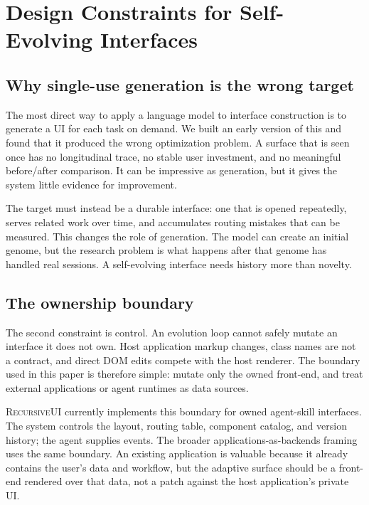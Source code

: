 \documentclass[11pt]{article}
\begin{document}
\section{Design Constraints for Self-Evolving Interfaces}
\label{sec:position}

\subsection{Why single-use generation is the wrong target}
\label{sec:seenonce}

The most direct way to apply a language model to interface construction is to
generate a UI for each task on demand. We built an early version of this and
found that it produced the wrong optimization problem. A surface that is seen
once has no longitudinal trace, no stable user investment, and no meaningful
before/after comparison. It can be impressive as generation, but it gives the
system little evidence for improvement.

The target must instead be a durable interface: one that is opened repeatedly,
serves related work over time, and accumulates routing mistakes that can be
measured. This changes the role of generation. The model can create an initial
genome, but the research problem is what happens after that genome has handled
real sessions. A self-evolving interface needs history more than novelty.

\subsection{The ownership boundary}
\label{sec:appsasbackends}

The second constraint is control. An evolution loop cannot safely mutate an
interface it does not own. Host application markup changes, class names are not a
contract, and direct DOM edits compete with the host renderer. The boundary used
in this paper is therefore simple: mutate only the owned front-end, and treat
external applications or agent runtimes as data sources.

\textsc{RecursiveUI} currently implements this boundary for owned agent-skill
interfaces. The system controls the layout, routing table, component catalog, and
version history; the agent supplies events. The broader
applications-as-backends framing uses the same boundary. An existing application
is valuable because it already contains the user's data and workflow, but the
adaptive surface should be a front-end rendered over that data, not a patch
against the host application's private UI.
\end{document}
